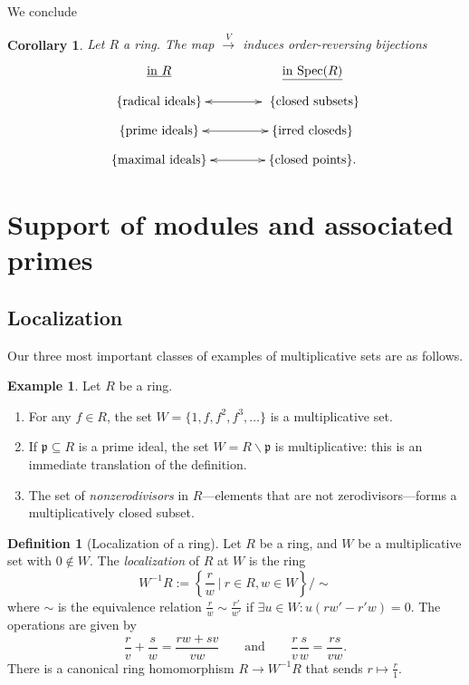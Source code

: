 \documentclass{amsart}[12pt]
\newcommand{\p}{{\mathfrak p}}
\numberwithin{equation}{section}
\theoremstyle{plain} %
\newtheorem{corollary}[equation]{Corollary}
\theoremstyle{definition}
\newtheorem{definition}[equation]{Definition}
\newtheorem{example}[equation]{Example}
\theoremstyle{remark}
\renewcommand{\sec}[1]{\section{#1}}
\newcommand{\ssec}[1]{\subsection{#1}}
\newcommand{\Spec}{\mathrm{Spec}}
\begin{document}
We conclude

\begin{corollary}
	Let $R$ a ring.
	The map $\xrightarrow{V}$ induces order-reversing bijections
\[	\xymatrix@R=.7em@C=4em{ \text{\underline{in $R$}} &  \text{\underline{in $\Spec(R)$}}  \\
\{\text{radical ideals}\} \ar@{<->}[r] & \ \{\text{closed subsets} \} \\
\{\text{prime ideals}\} \ar@{<->}[r]& \{\text{irred closeds} \} \\
\{\text{maximal ideals}\} \ar@{<->}[r] &  \{\text{closed points} \}. }\]
\end{corollary}




\sec{Support of modules and associated primes}

\ssec{Localization}



Our three most important classes of  examples of multiplicative sets are as follows.
\begin{example} Let $R$ be a ring.
	\begin{enumerate}
		\item For any $f\in R$, the set $W=\{1, f, f^2, f^3, \dots\}$ is a multiplicative set.
		\item If $\p\subseteq R$ is a prime ideal, the set $W=R\smallsetminus \p$ is multiplicative: this is an immediate translation of the definition.
		\item The set of \emph{nonzerodivisors} in $R$---elements that are not zerodivisors---forms a multiplicatively closed subset.
	\end{enumerate}
\end{example}

\begin{definition}[Localization of a ring]
	Let $R$ be a ring, and $W$ be a multiplicative set with $0\notin W$. The \emph{localization} of $R$ at $W$ is the ring 
	\[ W^{-1} R := \left\{ \frac{r} {w} \ \Big| \ r\in R, w\in W \right\} / \sim \]
	where $\sim$ is the equivalence relation $\displaystyle \frac{r}{w}\sim \frac{r'}{w'}$ if $\exists u\in W : u(rw'-r'w)=0$. The operations are given by 
	\[ \frac{r}{v}+\frac{s}{w}=\frac{rw+sv}{vw} \qquad \text{and} \qquad  \frac{r}{v}\frac{s}{w}=\frac{rs}{vw}.\]
	There is a canonical ring homomorphism $R\to W^{-1}R$ that sends $r \mapsto \frac{r}{1}$.
\end{definition}
\end{document}
